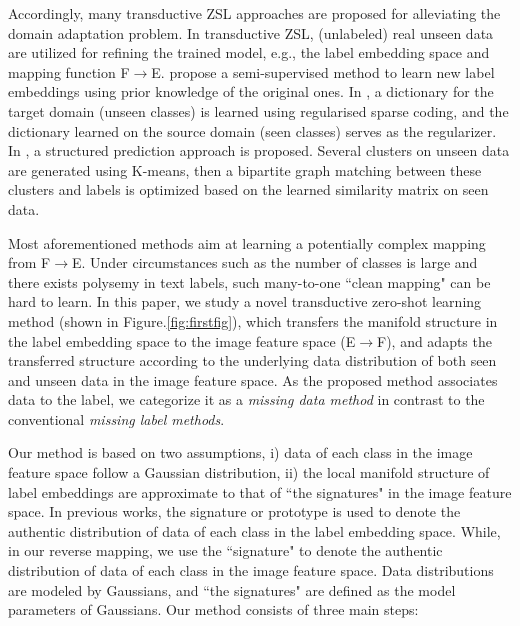 \documentclass{article}
\begin{document}
Accordingly, many transductive ZSL approaches are proposed for alleviating the domain adaptation problem\cite{fu2015transductive}. In transductive ZSL, (unlabeled) real unseen data are utilized for refining the trained model, e.g., the label embedding space and mapping function F$\rightarrow$E. \cite{li2015semi} propose a semi-supervised method to learn new label embeddings using prior knowledge of the original ones. In \cite{kodirov2015unsupervised}, a dictionary for the target domain (unseen classes) is learned using regularised sparse coding, and the dictionary learned on the source domain (seen classes) serves as the regularizer. In \cite{zhang2016SPZSL}, a structured prediction approach is proposed. Several clusters on unseen data are generated using K-means, then a bipartite graph matching between these clusters and labels is optimized based on the learned similarity matrix on seen data.


Most aforementioned methods aim at learning a potentially complex mapping from F$\rightarrow$E. Under circumstances such as the number of classes is large and there exists polysemy in text labels, such many-to-one ``clean mapping" can be hard to learn. In this paper, we study a novel transductive zero-shot learning method (shown in Figure.\ref{fig:firstfig}), which transfers the manifold structure in the label embedding space to the image feature space (E$\rightarrow$F), and adapts the transferred structure according to the underlying data distribution of both seen and unseen data in the image feature space. As the proposed method associates data to the label, we categorize it as a {\em missing data method} in contrast to the conventional {\em missing label methods}.


Our method is based on two assumptions, i) data of each class in the image feature space follow a Gaussian distribution, ii) the local manifold structure of label embeddings are approximate to that of ``the signatures" in the image feature space. In previous works, the signature\cite{romera2015embarrassingly} or prototype\cite{fu2015transductive} is used to denote the authentic distribution of data of each class in the label embedding space. While, in our reverse mapping, we use the ``signature" to
denote the authentic distribution of data of each class in the image feature space. Data distributions are modeled by Gaussians, and ``the signatures" are defined as the model parameters of Gaussians. Our method consists of three main steps:
\end{document}
